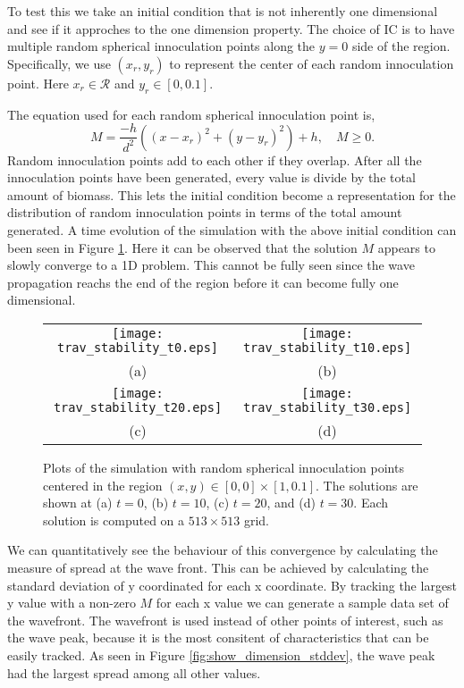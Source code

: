 To test this we take an initial condition that is not inherently one dimensional and see if it approches to the one dimension property.
The choice of IC is to have multiple random spherical innoculation points along the $y=0$ side of the region.
Specifically, we use $(x_r, y_r)$ to represent the center of each random innoculation point.
Here $x_r \in \mathcal{R}$ and $y_r \in [0, 0.1]$.

The equation used for each random spherical innoculation point is,
\begin{equation}
  M = \frac{-h}{d^2} \left( (x - x_r)^2 + (y - y_r)^2 \right) + h, \quad M \ge  0.
\end{equation}
Random innoculation points add to each other if they overlap.
After all the innoculation points have been generated, every value is divide by the total amount of biomass.
This lets the initial condition become a representation for the distribution of random innoculation points in terms of the total amount generated.
A time evolution of the simulation with the above initial condition can been seen in Figure \ref{fig:trav_stability}.
Here it can be observed that the solution $M$ appears to slowly converge to a 1D problem.
This cannot be fully seen since the wave propagation reachs the end of the region before it can become fully one dimensional.

\begin{figure}[h!tb]
  \centering
  \begin{tabular}{c c}
      \texttt{[image: trav\_stability\_t0.eps]} &
      \texttt{[image: trav\_stability\_t10.eps]} \\
      (a) & (b) \\
      \texttt{[image: trav\_stability\_t20.eps]} &
      \texttt{[image: trav\_stability\_t30.eps]} \\
      (c) & (d) 
  \end{tabular}
  \caption{Plots of the simulation with random spherical innoculation points centered in the region $(x,y) \in [0,0] \times [1,0.1]$.
    The solutions are shown at (a) $t = 0$, (b) $t = 10$, (c) $t = 20$, and (d) $t = 30$.
    Each solution is computed on a $513 \times 513$ grid. }
  \label{fig:trav_stability}
\end{figure}

We can quantitatively see the behaviour of this convergence by calculating the measure of spread at the wave front.
This can be achieved by calculating the standard deviation of y coordinated for each x coordinate.
By tracking the largest y value with a non-zero $M$ for each x value we can generate a sample data set of the wavefront.
The wavefront is used instead of other points of interest, such as the wave peak, because it is the most consitent of characteristics that can be easily tracked.
As seen in Figure \ref{fig:show_dimension_stddev}, the wave peak had the largest spread among all other values. 

